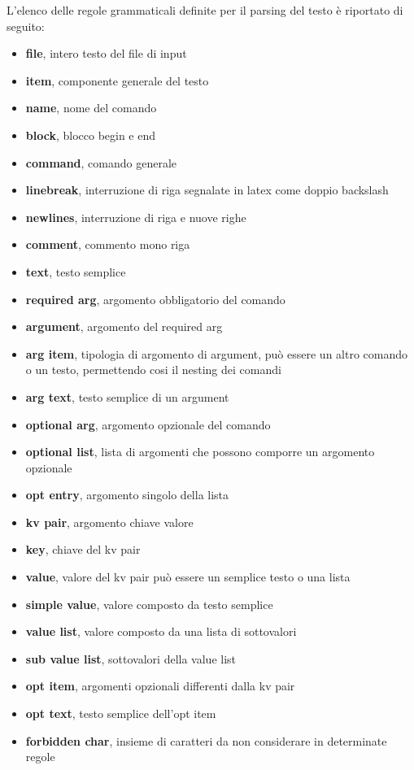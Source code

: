 \documentclass{article}
\begin{document}
    L'elenco delle regole grammaticali definite per il parsing del testo è riportato di seguito:
    \begin{itemize}
        \item \textbf{file}, intero testo del file di input
        \item \textbf{item}, componente generale del testo
        \item \textbf{name}, nome del comando
        \item \textbf{block}, blocco begin e end
        \item \textbf{command}, comando generale
        \item \textbf{linebreak}, interruzione di riga segnalate in latex come doppio backslash
        \item \textbf{newlines}, interruzione di riga e nuove righe
        \item \textbf{comment}, commento mono riga
        \item \textbf{text}, testo semplice
        \item \textbf{required arg}, argomento obbligatorio del comando
        \item \textbf{argument}, argomento del required arg
        \item \textbf{arg item}, tipologia di argomento di argument, può essere un altro comando o un testo, permettendo cosi il nesting dei comandi
        \item \textbf{arg text}, testo semplice di un argument
        \item \textbf{optional arg}, argomento opzionale del comando
        \item \textbf{optional list}, lista di argomenti che possono comporre un argomento opzionale
        \item \textbf{opt entry}, argomento singolo della lista
        \item \textbf{kv pair}, argomento chiave valore
        \item \textbf{key}, chiave del kv pair
        \item \textbf{value}, valore del kv pair può essere un semplice testo o una lista
        \item \textbf{simple value}, valore composto da testo semplice
        \item \textbf{value list}, valore composto da una lista di sottovalori
        \item \textbf{sub value list}, sottovalori della value list
        \item \textbf{opt item}, argomenti opzionali differenti dalla kv pair
        \item \textbf{opt text}, testo semplice dell'opt item
        \item \textbf{forbidden char}, insieme di caratteri da non considerare in determinate regole
    \end{itemize}
\end{document}

